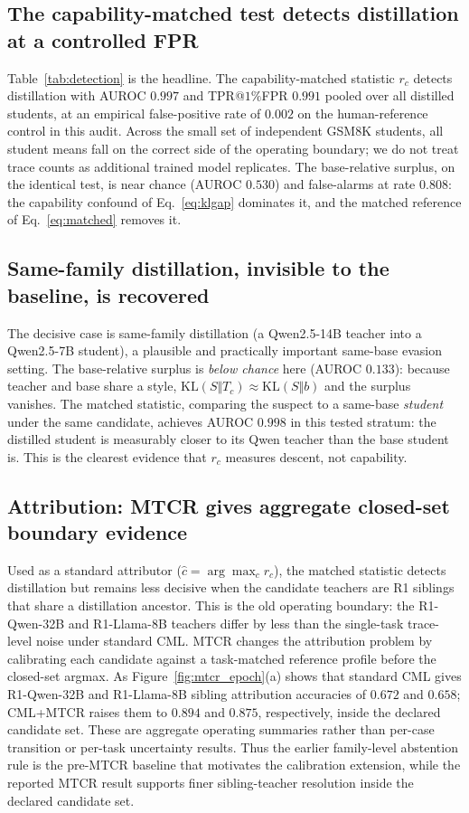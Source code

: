 \documentclass[journal]{IEEEtran}
\begin{document}
\subsection{The capability-matched test detects distillation at a controlled FPR}
Table~\ref{tab:detection} is the headline. The capability-matched statistic $r_c$ detects distillation with
AUROC $0.997$ and TPR@$1\%$FPR $0.991$ pooled over all distilled students, at an empirical
false-positive rate of $0.002$ on the human-reference control in this audit. Across
the small set of independent GSM8K students, all student means fall on the correct
side of the operating boundary; we do not treat trace counts as additional trained
model replicates. The base-relative
surplus, on the identical test, is near chance (AUROC $0.530$) and false-alarms at rate $0.808$: the
capability confound of Eq.~\eqref{eq:klgap} dominates it, and the matched reference of Eq.~\eqref{eq:matched}
removes it.

\subsection{Same-family distillation, invisible to the baseline, is recovered}
The decisive case is same-family distillation (a Qwen2.5-14B teacher into a Qwen2.5-7B student), a plausible
and practically important same-base evasion setting. The base-relative surplus is \emph{below chance} here (AUROC $0.133$): because teacher
and base share a style, $\mathrm{KL}(S\Vert T_c)\!\approx\!\mathrm{KL}(S\Vert b)$ and the surplus vanishes.
The matched statistic, comparing the suspect to a same-base \emph{student} under the same candidate, achieves
AUROC $0.998$ in this tested stratum: the distilled student is measurably closer to its Qwen teacher than the
base student is. This is the clearest evidence that $r_c$ measures descent, not capability.

\subsection{Attribution: MTCR gives aggregate closed-set boundary evidence}
Used as a standard attributor ($\hat c=\arg\max_c r_c$), the matched statistic detects
distillation but remains less decisive when the candidate teachers are R1 siblings
that share a distillation ancestor. This is the old operating boundary: the R1-Qwen-32B
and R1-Llama-8B teachers differ by less than the single-task trace-level noise under
standard CML. MTCR changes the attribution problem by calibrating each candidate
against a task-matched reference profile before the closed-set argmax. As
Figure~\ref{fig:mtcr_epoch}(a) shows that standard CML gives R1-Qwen-32B and R1-Llama-8B sibling
attribution accuracies of $0.672$ and $0.658$; CML+MTCR raises them to $0.894$ and
$0.875$, respectively, inside the declared candidate set. These are aggregate
operating summaries rather than per-case transition or per-task uncertainty results. Thus the earlier
family-level abstention rule is the pre-MTCR baseline that motivates the calibration
extension, while the reported MTCR result supports finer sibling-teacher resolution inside the declared candidate set.
\end{document}
